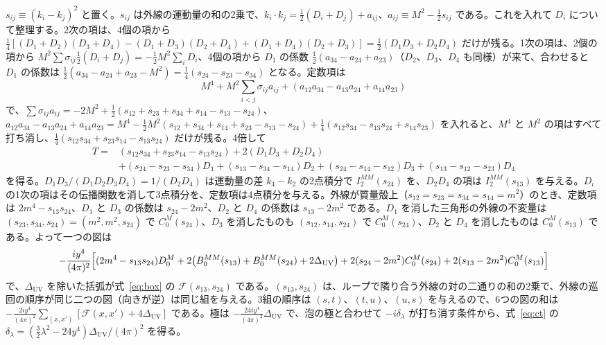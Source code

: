\documentclass[a4paper,10pt]{ltjsarticle}
\begin{document}
$s_{ij}\equiv(k_i-k_j)^2$ と置く。$s_{ij}$ は外線の運動量の和の2乗で、$k_i\cdot k_j=\frac12(D_i+D_j)+a_{ij}$、$a_{ij}\equiv M^2-\frac12s_{ij}$ である。これを入れて $D_i$ について整理する。2次の項は、4個の項から $\frac14[(D_1+D_2)(D_3+D_4)-(D_1+D_3)(D_2+D_4)+(D_1+D_4)(D_2+D_3)]=\frac12(D_1D_3+D_2D_4)$ だけが残る。1次の項は、2個の項から $M^2\sum\sigma_{ij}\frac12(D_i+D_j)=-\frac12M^2\sum_iD_i$、4個の項から $D_1$ の係数 $\frac12(a_{34}-a_{24}+a_{23})$（$D_2$、$D_3$、$D_4$ も同様）が来て、合わせると $D_1$ の係数は $\frac12(a_{34}-a_{24}+a_{23}-M^2)=\frac14(s_{24}-s_{23}-s_{34})$ となる。定数項は
\begin{equation*}
M^4+M^2\sum_{i<j}\sigma_{ij}a_{ij}+(a_{12}a_{34}-a_{13}a_{24}+a_{14}a_{23})
\end{equation*}
で、$\sum\sigma_{ij}a_{ij}=-2M^2+\frac12(s_{12}+s_{23}+s_{34}+s_{14}-s_{13}-s_{24})$、$a_{12}a_{34}-a_{13}a_{24}+a_{14}a_{23}=M^4-\frac12M^2(s_{12}+s_{34}+s_{14}+s_{23}-s_{13}-s_{24})+\frac14(s_{12}s_{34}-s_{13}s_{24}+s_{14}s_{23})$ を入れると、$M^4$ と $M^2$ の項はすべて打ち消し、$\frac14(s_{12}s_{34}+s_{23}s_{14}-s_{13}s_{24})$ だけが残る。4倍して
\begin{equation*}
\begin{aligned}
T={}&(s_{12}s_{34}+s_{23}s_{14}-s_{13}s_{24})+2(D_1D_3+D_2D_4)\\
&+(s_{24}-s_{23}-s_{34})D_1+(s_{13}-s_{34}-s_{14})D_2+(s_{24}-s_{14}-s_{12})D_3+(s_{13}-s_{12}-s_{23})D_4
\end{aligned}
\end{equation*}
を得る。$D_1D_3/(D_1D_2D_3D_4)=1/(D_2D_4)$ は運動量の差 $k_4-k_2$ の2点積分で $I_2^{MM}(s_{24})$ を、$D_2D_4$ の項は $I_2^{MM}(s_{13})$ を与える。$D_i$ の1次の項はその伝播関数を消して3点積分を、定数項は4点積分を与える。外線が質量殻上（$s_{12}=s_{23}=s_{34}=s_{14}=m^2$）のとき、定数項は $2m^4-s_{13}s_{24}$、$D_1$ と $D_3$ の係数は $s_{24}-2m^2$、$D_2$ と $D_4$ の係数は $s_{13}-2m^2$ である。$D_1$ を消した三角形の外線の不変量は $(s_{23},s_{34},s_{24})=(m^2,m^2,s_{24})$ で $C_0^M(s_{24})$、$D_3$ を消したものも $(s_{12},s_{14},s_{24})$ で $C_0^M(s_{24})$、$D_2$ と $D_4$ を消したものは $C_0^M(s_{13})$ である。よって一つの図は
\begin{equation*}
-\frac{iy^4}{(4\pi)^2}\Bigl[(2m^4-s_{13}s_{24})D_0^M+2\bigl(B_0^{MM}(s_{13})+B_0^{MM}(s_{24})+2\Delta_{\mathrm{UV}}\bigr)+2(s_{24}-2m^2)C_0^M(s_{24})+2(s_{13}-2m^2)C_0^M(s_{13})\Bigr]
\end{equation*}
で、$\Delta_{\mathrm{UV}}$ を除いた括弧が式~\eqref{eq:box} の $\mathcal F(s_{13},s_{24})$ である。$(s_{13},s_{24})$ は、ループで隣り合う外線の対の二通りの和の2乗で、外線の巡回の順序が同じ二つの図（向きが逆）は同じ組を与える。3組の順序は $(s,t)$、$(t,u)$、$(u,s)$ を与えるので、6つの図の和は $-\frac{2iy^4}{(4\pi)^2}\sum_{(x,x')}[\mathcal F(x,x')+4\Delta_{\mathrm{UV}}]$ である。極は $-\frac{24iy^4}{(4\pi)^2}\Delta_{\mathrm{UV}}$ で、泡の極と合わせて $-i\delta_\lambda$ が打ち消す条件から、式~\eqref{eq:ct} の $\delta_\lambda=(\frac32\lambda^2-24y^4)\Delta_{\mathrm{UV}}/(4\pi)^2$ を得る。
\end{document}
